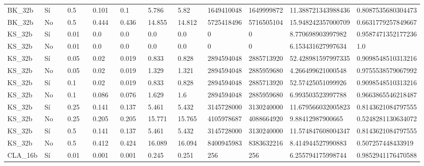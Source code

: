 {{\begin{longtable}{M{0.09\linewidth}M{0.09\linewidth}M{0.09\linewidth}M{0.09\linewidth}M{0.09\linewidth}M{0.09\linewidth}M{0.09\linewidth}M{0.09\linewidth}M{0.09\linewidth}M{0.09\linewidth}M{0.09\linewidth}}
BK\_32b & Sí & \num{0.5} & \num{0.101} & \num{0.1} & \num{5.786} & \num{5.82} & \num{1649410048} & \num{1649999872} & \num{11.388721343988436} & \num{0.8087535680304473} \\
BK\_32b & No & \num{0.5} & \num{0.444} & \num{0.436} & \num{14.855} & \num{14.812} & \num{5725418496} & \num{5716505104} & \num{15.948242357000709} & \num{0.6631779257849667} \\
KS\_32b & Sí & \num{0.01} & \num{0.0} & \num{0.0} & \num{0.0} & \num{0.0} & \num{0} & \num{0} & \num{8.770698903997982} & \num{0.9587471352177236} \\
KS\_32b & No & \num{0.01} & \num{0.0} & \num{0.0} & \num{0.0} & \num{0.0} & \num{0} & \num{0} & \num{6.153431627997634} & \num{1.0} \\
KS\_32b & Sí & \num{0.05} & \num{0.02} & \num{0.019} & \num{0.833} & \num{0.828} & \num{2894594048} & \num{2885713920} & \num{52.428981597997335} & \num{0.9098548510313216} \\
KS\_32b & No & \num{0.05} & \num{0.02} & \num{0.019} & \num{1.329} & \num{1.321} & \num{2894594048} & \num{2885959680} & \num{4.266499621000548} & \num{0.9755538579067992} \\
KS\_32b & Sí & \num{0.1} & \num{0.02} & \num{0.019} & \num{0.833} & \num{0.828} & \num{2894594048} & \num{2885713920} & \num{52.57425051099926} & \num{0.9098548510313216} \\
KS\_32b & No & \num{0.1} & \num{0.086} & \num{0.076} & \num{1.629} & \num{1.6} & \num{2894594048} & \num{2885959680} & \num{6.993503523997788} & \num{0.9663865546218487} \\
KS\_32b & Sí & \num{0.25} & \num{0.141} & \num{0.137} & \num{5.461} & \num{5.432} & \num{3145728000} & \num{3130240000} & \num{11.679566032005823} & \num{0.8143621084797555} \\
KS\_32b & No & \num{0.25} & \num{0.205} & \num{0.205} & \num{15.771} & \num{15.765} & \num{4105978687} & \num{4088664920} & \num{9.88412987900665} & \num{0.5248281130634072} \\
KS\_32b & Sí & \num{0.5} & \num{0.141} & \num{0.137} & \num{5.461} & \num{5.432} & \num{3145728000} & \num{3130240000} & \num{11.574847608004347} & \num{0.8143621084797555} \\
KS\_32b & No & \num{0.5} & \num{0.412} & \num{0.424} & \num{16.089} & \num{16.094} & \num{8400945983} & \num{8383632216} & \num{8.414944527990883} & \num{0.507257448433919} \\
CLA\_16b & Sí & \num{0.01} & \num{0.001} & \num{0.001} & \num{0.245} & \num{0.251} & \num{256} & \num{256} & \num{6.255794175998744} & \num{0.9852941176470588} \\

\end{longtable}}}
